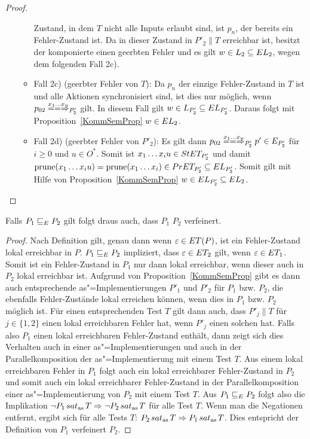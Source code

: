 \begin{proof}
\begin{itemize}
\begin{itemize}
          Zustand, in dem $T$ nicht alle Inputs erlaubt sind, ist $p_n$, der
          bereits ein Fehler-Zustand ist. Da in dieser Zustand in $P'_2\|T$
          erreichbar ist, besitzt der komponierte \MEIO{} einen geerbten Fehler
          und es gilt $w\in L_2\subseteq EL _2$, wegen dem folgenden Fall 2c).
        \item Fall 2c) (geerbter Fehler von $T$): Da $p_n$ der einzige
          Fehler-Zustand in $T$ ist und alle Aktionen synchronisiert sind, ist
          dies nur möglich, wenn $p_{02} \lweakmay[x_1\dots x_n]_{P'_2}$ gilt.
          In diesem Fall gilt $w\in L_{P'_2}\subseteq EL _{P'_2}$. Daraus
          folgt mit Proposition~\ref{KommSemProp} $w\in EL _2$.
        \item Fall 2d) (geerbter Fehler von $P'_2$): Es gilt dann $p_{02}
          \lweakmay[x_1\dots x_n]_{P'_2} p'\in E_{P'_2}$ für $i\geq 0$ und
          $u\in O^*$. Somit ist $x_1\dots x_i u\in StET _{P'_2}$ und damit
          $\mathrm{prune} (x_1\dots x_iu) =\mathrm{prune} (x_1\dots x_i)\in PrET
          _{P'_2}\subseteq EL _{P'_2}$. Somit gilt mit Hilfe von
          Proposition~\ref{KommSemProp} $w\in EL _{P'_2}\subseteq EL _2$.
      \end{itemize}
  \end{itemize}
\end{proof}

\begin{Satz}
  \label{KommTestVerfSatz}
  Falls $P_1 \sqsubseteq  _E P_2$ gilt folgt draus auch, dass $P_1$ $P_2$ verfeinert.
\end{Satz}
\begin{proof}
  Nach Definition gilt, genau dann wenn $\varepsilon\in ET (P)$, ist ein
  Fehler-Zustand lokal erreichbar in $P$. $P_1 \sqsubseteq  _E P_2$ impliziert, dass
  $\varepsilon\in ET _2$ gilt, wenn $\varepsilon\in ET _1$. Somit ist ein
  Fehler-Zustand in $P_1$ nur dann lokal erreichbar, wenn dieser auch in $P_2$
  lokal erreichbar ist. Aufgrund von Proposition~\ref{KommSemProp} gibt es dann
  auch entsprechende as"=Implementierungen $P'_1$ und $P'_2$ für $P_1$ bzw.
  $P_2$, die ebenfalls Fehler-Zustände lokal erreichen können, wenn dies in
  $P_1$ bzw. $P_2$ möglich ist. Für einen entsprechenden Test $T$ gilt dann
  auch, dass $P'_j\|T$ für $j\in\{1,2\}$ einen lokal erreichbaren Fehler hat,
  wenn $P'_j$ einen solchen hat. Falls also $P_1$ einen lokal erreichbaren
  Fehler-Zustand enthält, dann zeigt sich dies Verhalten auch in einer
  as"=Implementierungen und auch in der Parallelkomposition der
  as"=Implementierung mit einem Test $T$. Aus einem lokal erreichbaren Fehler
  in $P_1$ folgt auch ein lokal erreichbarer Fehler-Zustand in $P_2$ und somit
  auch ein lokal erreichbarer Fehler-Zustand in der Parallelkomposition einer
  as"=Implementierung von $P_2$ mit einem Test $T$. Aus $P_1 \sqsubseteq  _E P_2$ folgt
  also die Implikation $\neg P_1 \hspace{0.05cm}sat_\mathrm{as}\hspace{0.05cm} T \Rightarrow \neg P_2 \hspace{0.05cm}sat_\mathrm{as}\hspace{0.05cm} T$ für
  alle Test $T$. Wenn man die Negationen entfernt, ergibt sich für alle Tests
  $T$: $P_2\hspace{0.05cm}sat_\mathrm{as}\hspace{0.05cm} T\Rightarrow P_1\hspace{0.05cm}sat_\mathrm{as}\hspace{0.05cm} T$. Dies entspricht der Definition von
  $P_1$ verfeinert $P_2$.
\end{proof}

